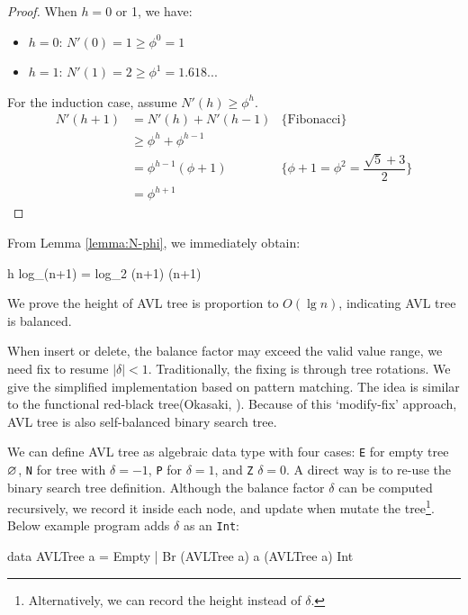 \documentclass[b5paper]{article}
\begin{document}
\begin{proof}
When $h = 0$ or 1, we have:
\begin{itemize}
\item $h = 0$: $N'(0) = 1 \geq \phi^0 = 1$
\item $h = 1$: $N'(1) = 2 \geq \phi^1 = 1.618...$
\end{itemize}

For the induction case, assume $N'(h) \geq \phi^h$.
\[
  \begin{array}{rll}
  N'(h+1) & = N'(h) + N'(h-1) & \{\text{Fibonacci}\} \\
          & \geq \phi^h + \phi^{h-1} & \\
          & = \phi^{h-1}(\phi + 1) & \{\phi + 1 = \phi^2 = \dfrac{\sqrt{5}+3}{2}\} \\
          & = \phi^{h+1}
 \end{array}
\]
\end{proof}

From Lemma \ref{lemma:N-phi}, we immediately obtain:

\be
  h \leq log_{\phi}(n+1) = log_{\phi}2 \cdot \lg (n+1)  \lg (n+1)
  \label{eq:AVL-height}
\ee

We prove the height of AVL tree is proportion to $O(\lg n)$, indicating AVL tree is balanced.

When insert or delete, the balance factor may exceed the valid value range, we need fix to resume $|\delta|<1$. Traditionally, the fixing is through tree rotations. We give the simplified implementation based on pattern matching. The idea is similar to the functional red-black tree(Okasaki, \cite{okasaki}). Because of this `modify-fix' approach, AVL tree is also self-balanced binary search tree.

We can define AVL tree as algebraic data type with four cases\cite{hackage}: \texttt{E} for empty tree $\varnothing$, \texttt{N} for tree with $\delta = -1$, \texttt{P} for $\delta = 1$, and \texttt{Z} $\delta = 0$. A direct way is to re-use the binary search tree definition. Although the balance factor $\delta$ can be computed recursively, we record it inside each node, and update when mutate the tree\footnote{Alternatively, we can record the height instead of $\delta$\cite{py-avl}.}. Below example program adds $\delta$ as an \texttt{Int}:

\lstset{frame = single}
\begin{Haskell}
data AVLTree a = Empty
               | Br (AVLTree a) a (AVLTree a) Int
\end{Haskell}
\end{document}
